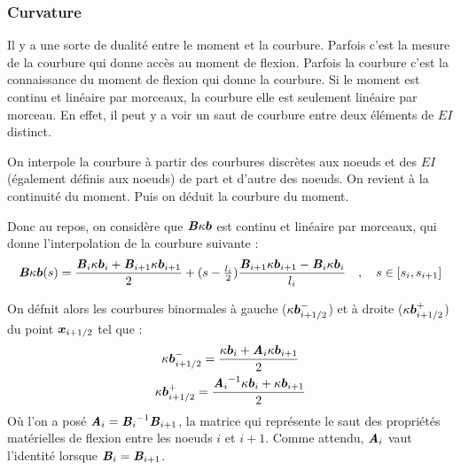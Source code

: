 \subsubsection{Curvature}
Il y a une sorte de dualité entre le moment et la courbure.
Parfois c'est la mesure de la courbure qui donne accès au moment de flexion.
Parfois la courbure c'est la connaissance du moment de flexion qui donne la courbure.
Si le moment est continu et linéaire par morceaux, la courbure elle est seulement linéaire par morceau.
En effet, il peut y a voir un saut de courbure entre deux éléments de $EI$ distinct.

On interpole la courbure à partir des courbures discrètes aux noeuds et des $EI$ (également définis aux noeuds) de part et d'autre des noeuds.
On revient à la continuité du moment. Puis on déduit la courbure du moment.

Donc au repos, on considère que $\boldsymbol{\mathit{B}}\kappa\boldsymbol{b}$ est continu et linéaire par morceaux, qui donne l'interpolation de la courbure suivante :
\begin{equation}
	\boldsymbol{\mathit{B}}\kappa\boldsymbol{b}(s) =
	\frac{\boldsymbol{\mathit{B}}_{i}\kappa\boldsymbol{b}_{i} + \boldsymbol{\mathit{B}}_{i+1}\kappa\boldsymbol{b}_{i+1}}{2}
	+ (s-\tfrac{l_i}{2}) \frac{\boldsymbol{\mathit{B}}_{i+1}\kappa\boldsymbol{b}_{i+1} - \boldsymbol{\mathit{B}}_{i}\kappa\boldsymbol{b}_{i}}{l_i}
	\quad , \quad s \in [s_i,s_{i+1}]
\end{equation}

On défnit alors les courbures binormales à gauche ($\kappa\boldsymbol{b}_{i+1/2}^-$) et à droite ($\kappa\boldsymbol{b}_{i+1/2}^+$) du point $\boldsymbol{x}_{i+1/2}$ tel que :
\begin{subequations}
	\begin{gather}
		\kappa\boldsymbol{b}_{i+1/2}^- = \frac{\kappa\boldsymbol{b}_{i} + \boldsymbol{\mathit{A}}_i \kappa\boldsymbol{b}_{i+1}}{2} \\
		\kappa\boldsymbol{b}_{i+1/2}^+ = \frac{{\boldsymbol{\mathit{A}}_{i}}^{-1}\kappa\boldsymbol{b}_{i} + \kappa\boldsymbol{b}_{i+1}}{2}
	\end{gather}
\end{subequations}
Où l'on a posé $\boldsymbol{\mathit{A}}_i = {\boldsymbol{\mathit{B}}_{i}}^{-1}\boldsymbol{\mathit{B}}_{i+1}$, la matrice qui représente le saut des propriétés matérielles de flexion entre les noeuds $i$ et $i+1$. Comme attendu, $\boldsymbol{\mathit{A}}_i$ vaut l'identité lorsque $\boldsymbol{\mathit{B}}_i = \boldsymbol{\mathit{B}}_{i+1}$.

